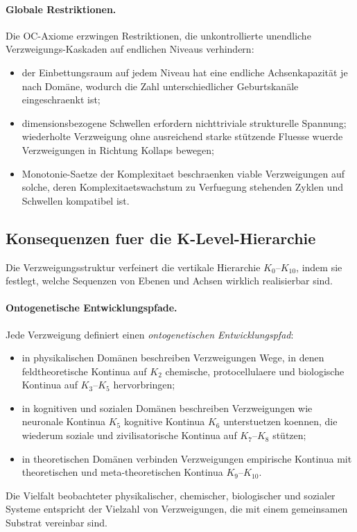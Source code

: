 \paragraph{Globale Restriktionen.}
Die OC-Axiome erzwingen Restriktionen, die unkontrollierte unendliche
Verzweigungs-Kaskaden auf endlichen Niveaus verhindern:
\begin{itemize}
  \item der Einbettungsraum auf jedem Niveau hat eine endliche Achsenkapazität
        je nach Domäne, wodurch die Zahl unterschiedlicher Geburtskanäle
        eingeschraenkt ist;
  \item dimensionsbezogene Schwellen erfordern nichttriviale strukturelle
        Spannung; wiederholte Verzweigung ohne ausreichend starke stützende
        Fluesse wuerde Verzweigungen in Richtung Kollaps bewegen;
  \item Monotonie-Saetze der Komplexitaet beschraenken viable Verzweigungen auf
        solche, deren Komplexitaetswachstum zu Verfuegung stehenden Zyklen und
        Schwellen kompatibel ist.
\end{itemize}

\subsection{Konsequenzen fuer die K-Level-Hierarchie}

Die Verzweigungsstruktur verfeinert die vertikale Hierarchie \(K_0\)–\(K_{10}\),
indem sie festlegt, welche Sequenzen von Ebenen und Achsen wirklich
realisierbar sind.

\paragraph{Ontogenetische Entwicklungspfade.}
Jede Verzweigung definiert einen \emph{ontogenetischen Entwicklungspfad}:
\begin{itemize}
  \item in physikalischen Domänen beschreiben Verzweigungen Wege, in denen feldtheoretische
        Kontinua auf \(K_2\) chemische, protocellulaere und biologische
        Kontinua auf \(K_3\)–\(K_5\) hervorbringen;
  \item in kognitiven und sozialen Domänen beschreiben Verzweigungen wie neuronale
        Kontinua \(K_5\) kognitive Kontinua \(K_6\) unterstuetzen koennen,
        die wiederum soziale und zivilisatorische Kontinua auf \(K_7\)–\(K_8\)
        stützen;
  \item in theoretischen Domänen verbinden Verzweigungen empirische Kontinua mit
        theoretischen und meta-theoretischen Kontinua \(K_9\)–\(K_{10}\).
\end{itemize}
Die Vielfalt beobachteter physikalischer, chemischer, biologischer und sozialer
Systeme entspricht der Vielzahl von Verzweigungen, die mit einem gemeinsamen
Substrat vereinbar sind.

